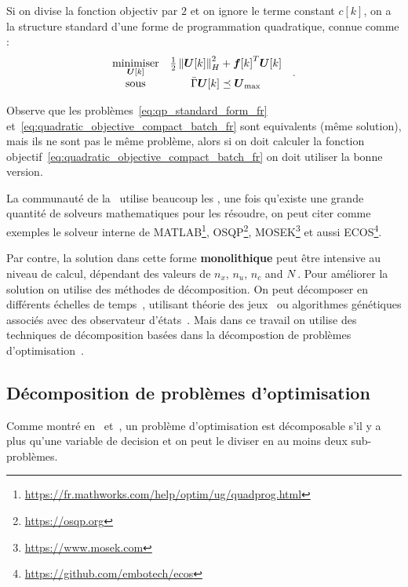 \documentclass[../main.tex]{subfiles}
\begin{document}
Si on divise la fonction objectiv par $2$ et on ignore le terme constant $c[k]$, on a la structure standard d'une forme de programmation quadratique, connue comme \qp{}:
\begin{equation}
  \label{eq:qp_standard_form_fr}
  \begin{aligned}
    \begin{matrix}
      \mathop{\textrm{minimiser}}\limits_{\boldsymbol{U}[k]} &
      \frac{1}{2}\left\lVert\boldsymbol{U}[k]\right\rVert^{2}_{H} + {\boldsymbol{f}[k]}^{T}\boldsymbol{U}[k] &\\
      \mathrm{sous} &
\bar{\Gamma}\boldsymbol{U}[k]\preceq {\boldsymbol{U}}_{\text{max}}
    \end{matrix}
  \end{aligned}.
\end{equation}
\begin{remark}\label{rem:equivalence_problems_not_same_objective_fr}
  Observe que les problèmes~\eqref{eq:qp_standard_form_fr} et~\eqref{eq:quadratic_objective_compact_batch_fr} sont equivalents (même solution), mais ils ne sont pas le même problème, alors si on doit calculer la fonction objectif~\eqref{eq:quadratic_objective_compact_batch_fr} on doit utiliser la bonne version.
\end{remark}

La communauté de la \mpc\ utilise beaucoup les \qp{}, une fois qu'existe
une grande quantité de solveurs mathematiques pour les résoudre, on peut citer comme exemples le solveur interne de MATLAB\footnote{\url{https://fr.mathworks.com/help/optim/ug/quadprog.html}}, OSQP\footnote{\url{https://osqp.org}}, MOSEK\footnote{\url{https://www.mosek.com}} et aussi ECOS\footnote{\url{https://github.com/embotech/ecos}}.

Par contre, la solution dans cette forme \textbf{monolithique} peut être intensive au niveau de calcul, dépendant des valeurs de $n_{x}$, $n_{u}$, $n_{c}$ and $N$.
Pour améliorer la solution on utilise des méthodes de décomposition.
On peut décomposer en différents échelles de temps~\cite{ChenEtAl2011}, utilisant théorie des jeux~\cite{MaestreEtAl2011} ou algorithmes génétiques associés avec des observateur d'états~\cite{XieEtAl2016}.
Mais dans ce travail on utilise des techniques de décomposition basées dans la décompostion de problèmes d'optimisation~\cite{GiselssonEtAl2013}.

\subsection{Décomposition de problèmes d'optimisation}\label{sec:decomp-de-probl}
Comme montré en~\cite{ConejoEtAl2006} et~\cite{BoydEtAl2015}, un problème d'optimisation est décomposable s'il y a plus qu'une variable de decision et on peut le diviser en au moins deux sub-problèmes.
\end{document}
